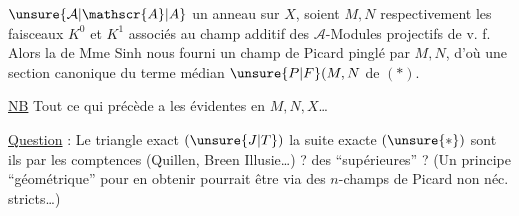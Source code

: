 
\uline{}\unsure{:|,}  $\unsure{\mathcal{A}|\mathscr{A}|A}$ un anneau sur $X$, soient $M,N$ respectivement les faisceaux $K^{0}$ et $K^{1}$ associés au champ additif des $\mathcal{A}$-Modules projectifs de v. f.  Alors la  de Mme Sinh nous fourni un champ de Picard pinglé par $M,N$, d'où une section  canonique du terme médian $\unsure{P|F}(M,N$ de $(*)$.

\uline{NB} Tout ce qui précède a les  évidentes en $M,N,X$\ldots

\uline{Question} : Le triangle exact $(\unsure{J|T})$  la suite exacte $(\unsure{*})$ sont ils  par les comptences (Quillen, Breen Illusie\ldots) ?  des  ``supérieures'' ? (Un principe ``géométrique'' pour en obtenir pourrait être via des $n$-champs de Picard non néc. stricts\ldots)

